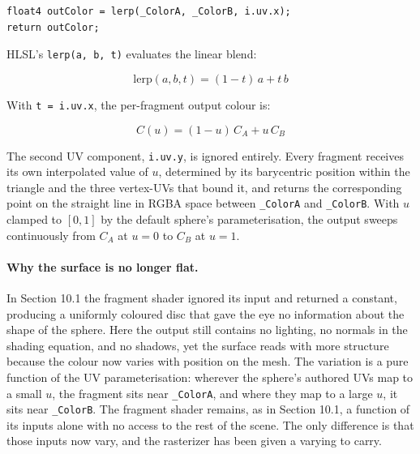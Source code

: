\documentclass[11pt]{article}
\begin{document}
\begin{lstlisting}
float4 outColor = lerp(_ColorA, _ColorB, i.uv.x);
return outColor;
\end{lstlisting}

HLSL's \texttt{lerp(a, b, t)} evaluates the linear blend:

\begin{equation}
    \text{lerp}(a, b, t) = (1 - t) \, a + t \, b
\end{equation}

With \texttt{t = i.uv.x}, the per-fragment output colour is:

\begin{equation}
    C(u) = (1 - u) \, C_A + u \, C_B
\end{equation}

The second UV component, \texttt{i.uv.y}, is ignored entirely. Every fragment receives its own interpolated value of $u$, determined by its barycentric position within the triangle and the three vertex-UVs that bound it, and returns the corresponding point on the straight line in RGBA space between \texttt{\_ColorA} and \texttt{\_ColorB}. With $u$ clamped to $[0, 1]$ by the default sphere's parameterisation, the output sweeps continuously from $C_A$ at $u = 0$ to $C_B$ at $u = 1$.

\paragraph{Why the surface is no longer flat.}

In Section 10.1 the fragment shader ignored its input and returned a constant, producing a uniformly coloured disc that gave the eye no information about the shape of the sphere. Here the output still contains no lighting, no normals in the shading equation, and no shadows, yet the surface reads with more structure because the colour now varies with position on the mesh. The variation is a pure function of the UV parameterisation: wherever the sphere's authored UVs map to a small $u$, the fragment sits near \texttt{\_ColorA}, and where they map to a large $u$, it sits near \texttt{\_ColorB}. The fragment shader remains, as in Section 10.1, a function of its inputs alone with no access to the rest of the scene. The only difference is that those inputs now vary, and the rasterizer has been given a varying to carry.
\end{document}
